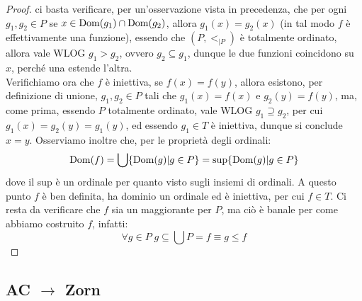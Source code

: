 \begin{proof}
	ci basta verificare, per un'osservazione vista in precedenza, che per ogni $g_1,g_2 \in P$ se $x \in \operatorname{Dom}(g_1) \cap \operatorname{Dom}(g_2)$, allora $g_1(x) = g_2(x)$ (in tal modo $f$ \`e effettivamente una funzione), essendo che $(P,<_{|P})$ \`e totalmente ordinato, allora vale WLOG $g_1 > g_2$,
	ovvero $g_2 \subseteq g_1$, dunque le due funzioni coincidono su $x$, perch\'e una estende l'altra.\\
	Verifichiamo ora che $f$ \`e iniettiva, se $f(x) = f(y)$, allora esistono, per definizione di unione, $g_1,g_2 \in P$ tali che $g_1(x) = f(x)$ e $g_2(y) = f(y)$, ma, come prima, essendo $P$ totalmente ordinato, vale WLOG $g_1 \supseteq g_2$, per cui $g_1(x) = g_2(y) = g_1(y)$, ed essendo $g_1 \in T$ \`e iniettiva, dunque si conclude $x = y$.
	Osserviamo inoltre che, per le propriet\`a degli ordinali:
	\[ \operatorname{Dom}(f) = \bigcup\{\operatorname{Dom}(g) | g \in P\} = \sup\{\operatorname{Dom}(g) | g \in P\}
		\]
	dove il sup \`e un ordinale per quanto visto sugli insiemi di ordinali. A questo punto $f$ \`e ben definita, ha dominio un ordinale ed \`e iniettiva, per cui $f \in T$. Ci resta da verificare che $f$ sia un maggiorante per $P$, ma ci\`o \`e banale per come abbiamo costruito $f$, infatti:
	\[ \forall g \in P \; g \subseteq \bigcup P = f \equiv g \leq f
		\]
\end{proof}
 
\subsection{\texorpdfstring{AC $\rightarrow$ Zorn}{AC implica Zorn}}

